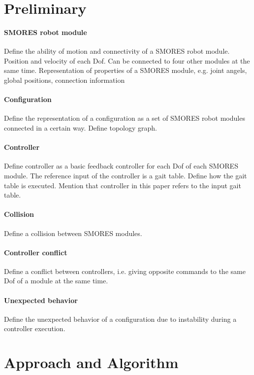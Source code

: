 \documentclass[12pt]{article}
\begin{document}
\section{Preliminary}

\paragraph{SMORES robot module}
Define the ability of motion and connectivity of a SMORES robot module. Position and velocity of each Dof. Can be connected to four other modules at the same time. Representation of properties of a SMORES module, e.g. joint angels, global positions, connection information

\paragraph{Configuration}
Define the representation of a configuration as a set of SMORES robot modules connected in a certain way. Define topology graph.


\paragraph{Controller}
Define controller as a basic feedback controller for each Dof of each SMORES module. The reference input of the controller is a gait table. Define how the gait table is executed. Mention that controller in this paper refers to the input gait table.


\paragraph{Collision}
Define a collision between SMORES modules.

\paragraph{Controller conflict}
Define a conflict between controllers, i.e. giving opposite commands to the same Dof of a module at the same time.

\paragraph{Unexpected behavior}
Define the unexpected behavior of a configuration due to instability during a controller execution.

\section{Approach and Algorithm}
\end{document}
